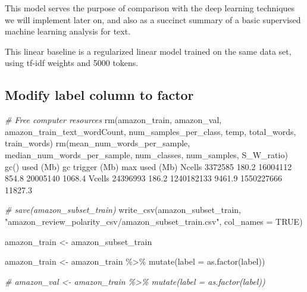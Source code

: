 \documentclass[
]{article}
\newenvironment{Shaded}{}{}
\newcommand{\AttributeTok}[1]{\textcolor[rgb]{0.49,0.56,0.16}{#1}}
\newcommand{\CommentTok}[1]{\textcolor[rgb]{0.38,0.63,0.69}{\textit{#1}}}
\newcommand{\ConstantTok}[1]{\textcolor[rgb]{0.53,0.00,0.00}{#1}}
\newcommand{\DecValTok}[1]{\textcolor[rgb]{0.25,0.63,0.44}{#1}}
\newcommand{\FloatTok}[1]{\textcolor[rgb]{0.25,0.63,0.44}{#1}}
\newcommand{\FunctionTok}[1]{\textcolor[rgb]{0.02,0.16,0.49}{#1}}
\newcommand{\NormalTok}[1]{#1}
\newcommand{\OtherTok}[1]{\textcolor[rgb]{0.00,0.44,0.13}{#1}}
\newcommand{\SpecialCharTok}[1]{\textcolor[rgb]{0.25,0.44,0.63}{#1}}
\newcommand{\StringTok}[1]{\textcolor[rgb]{0.25,0.44,0.63}{#1}}
\begin{document}
This model serves the purpose of comparison with the deep learning
techniques we will implement later on, and also as a succinct summary of
a basic supervised machine learning analysis for text.

This linear baseline is a regularized linear model trained on the same
data set, using tf-idf weights and 5000 tokens.

\hypertarget{modify-label-column-to-factor}{%
\subsection{Modify label column to
factor}\label{modify-label-column-to-factor}}

\begin{Shaded}
\begin{Highlighting}[]
\CommentTok{\# Free computer resources}
\FunctionTok{rm}\NormalTok{(amazon\_train, amazon\_val, amazon\_train\_text\_wordCount, num\_samples\_per\_class,}
\NormalTok{    temp, total\_words, train\_words)}
\FunctionTok{rm}\NormalTok{(mean\_num\_words\_per\_sample, median\_num\_words\_per\_sample, num\_classes, num\_samples,}
\NormalTok{    S\_W\_ratio)}
\FunctionTok{gc}\NormalTok{()}
           \FunctionTok{used}\NormalTok{  (Mb) gc }\FunctionTok{trigger}\NormalTok{   (Mb)   max }\FunctionTok{used}\NormalTok{    (Mb)}
\NormalTok{Ncells  }\DecValTok{3372585} \FloatTok{180.2}   \DecValTok{16004112}  \FloatTok{854.8}   \DecValTok{20005140}  \FloatTok{1068.4}
\NormalTok{Vcells }\DecValTok{24396993} \FloatTok{186.2} \DecValTok{1240182133} \FloatTok{9461.9} \DecValTok{1550227666} \FloatTok{11827.3}

\CommentTok{\# save(amazon\_subset\_train)}
\FunctionTok{write\_csv}\NormalTok{(amazon\_subset\_train, }\StringTok{"amazon\_review\_polarity\_csv/amazon\_subset\_train.csv"}\NormalTok{,}
    \AttributeTok{col\_names =} \ConstantTok{TRUE}\NormalTok{)}

\NormalTok{amazon\_train }\OtherTok{\textless{}{-}}\NormalTok{ amazon\_subset\_train}

\NormalTok{amazon\_train }\OtherTok{\textless{}{-}}\NormalTok{ amazon\_train }\SpecialCharTok{\%\textgreater{}\%}
    \FunctionTok{mutate}\NormalTok{(}\AttributeTok{label =} \FunctionTok{as.factor}\NormalTok{(label))}

\CommentTok{\# amazon\_val \textless{}{-} amazon\_train \%\textgreater{}\% mutate(label = as.factor(label))}
\end{Highlighting}
\end{Shaded}
\end{document}
